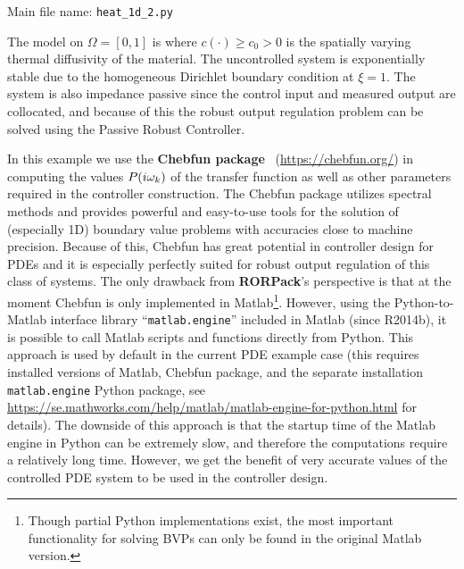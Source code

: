 \documentclass[11pt, a4paper]{amsart}
\theoremstyle{definition}
\numberwithin{equation}{section}
\newcommand{\wdist}{w_{\mbox{\scriptsize\textit{dist}}}}
\newcommand{\RORname}{\textbf{RORPack}}
\begin{document}
  \noindent Main file name: \texttt{heat\_1d\_2.py}

\medskip

The model on $\Omega = [0,1]$ is
\eq{
  \pd{x}{t}(\xi,t) &=  \pdb{\xi}(c(\xi)\pd{x}{\xi})(\xi,t), \qquad x(\xi,0)=x_0(\xi) \\
      -\pd{x}{\xi}(0,t) &= u(t)+\wdist(t), \qquad 
      x(1,t) = 0, \\
      y(t) &= x(0,t),
    }
    where $c(\cdot)\geq c_0>0$ is the spatially varying thermal diffusivity of the material.
The uncontrolled system is exponentially stable due to the homogeneous Dirichlet boundary condition at $\xi = 1$. The system is also impedance passive since the control input and measured output are collocated,  and because of this the robust output regulation problem can be solved using the Passive Robust Controller.

In this example we use the \textbf{\mbox{Chebfun} package}~\cite{DriHal14book,Tre13book} (\href{https://chebfun.org/}{https://chebfun.org/}) in computing the values $P(i\omega_k)$ of the transfer function as well as other parameters required in the controller construction. The Chebfun package utilizes spectral methods and provides powerful and easy-to-use tools for the solution of (especially 1D) boundary value problems with accuracies close to machine precision.
Because of this, Chebfun has great potential in controller design for PDEs and it is especially perfectly suited for robust output regulation of this class of systems.
The only drawback from \RORname's perspective is that at the moment Chebfun is only implemented in Matlab\footnote{Though partial Python implementations exist, the most important functionality for solving BVPs can only be found in the original Matlab version.}. However, using the Python-to-Matlab interface library ``\texttt{matlab.engine}'' included in Matlab (since R2014b), it is possible to call Matlab scripts and functions directly from Python. This approach is used by default in the current PDE example case (this requires installed versions of Matlab, Chebfun package, and the separate installation \texttt{matlab.engine} Python package, see \href{https://se.mathworks.com/help/matlab/matlab-engine-for-python.html}{https://se.mathworks.com/help/matlab/matlab-engine-for-python.html} for details). 
The downside of this approach is that the startup time of the Matlab engine in Python can be extremely slow, and therefore the computations require a relatively long time. However, we get the benefit of very accurate values of the controlled PDE system to be used in the controller design.
\end{document}
